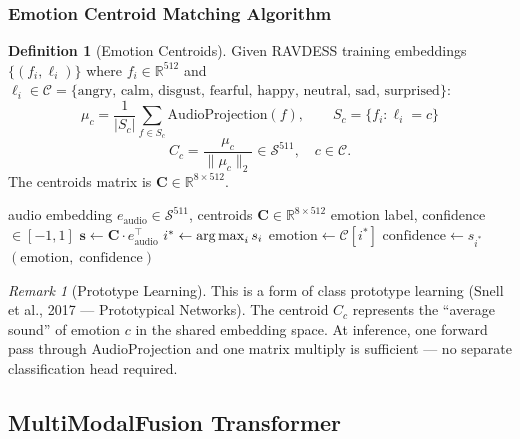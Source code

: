 \documentclass[12pt,a4paper]{article}
\theoremstyle{definition}
\newtheorem{definition}{Definition}[section]
\theoremstyle{plain}
\theoremstyle{remark}
\newtheorem{remark}{Remark}[section]
\newcommand{\R}{\mathbb{R}}
\newcommand{\Sph}{\mathcal{S}}
\newcommand{\argmax}{\operatornamewithlimits{arg\,max}}
\begin{document}
\subsubsection{Emotion Centroid Matching Algorithm}

\begin{definition}[Emotion Centroids]
Given RAVDESS training embeddings $\{(f_i, \ell_i)\}$ where $f_i \in \R^{512}$
and $\ell_i \in \mathcal{C} = \{\text{angry, calm, disgust, fearful, happy, neutral, sad, surprised}\}$:
\[
  \mu_c = \frac{1}{|S_c|}\sum_{f \in S_c} \text{AudioProjection}(f), \qquad
  S_c = \{f_i : \ell_i = c\}
\]
\[
  C_c = \frac{\mu_c}{\|\mu_c\|_2} \in \Sph^{511}, \quad c \in \mathcal{C}.
\]
The centroids matrix is $\mathbf{C} \in \R^{8 \times 512}$.
\end{definition}

\begin{algorithm}[H]
\caption{Emotion Classification via Centroid Matching}
\label{alg:emotion}
\begin{algorithmic}[1]
\Require audio embedding $e_{\text{audio}} \in \Sph^{511}$, centroids $\mathbf{C} \in \R^{8\times512}$
\Ensure emotion label, confidence $\in [-1,1]$
\State $\bm{s} \gets \mathbf{C} \cdot e_{\text{audio}}^\top$
\State $i^* \gets \argmax_{i} s_i$
\State $\text{emotion} \gets \mathcal{C}[i^*]$
\State $\text{confidence} \gets s_{i^*}$
\State \Return $(\text{emotion},\; \text{confidence})$
\end{algorithmic}
\end{algorithm}

\begin{remark}[Prototype Learning]
This is a form of class prototype learning (Snell et al., 2017 — Prototypical Networks).
The centroid $C_c$ represents the ``average sound'' of emotion $c$ in the shared
embedding space. At inference, one forward pass through AudioProjection and one
matrix multiply is sufficient — no separate classification head required.
\end{remark}

\subsection{MultiModalFusion Transformer}
\end{document}
